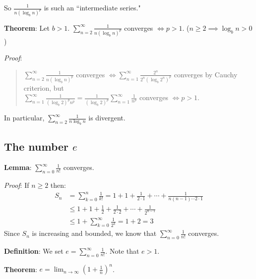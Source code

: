\documentclass[11pt]{article}
\begin{document}
So $\frac{1}{n(\log_b n)^p}$ is such an ``intermediate series."

\textbf{Theorem}: Let $b > 1$. $\sum\limits_{n=2}^\infty \frac{1}{n (\log_b n)^p}$ converges $\iff p > 1$. ($n \geq 2 \implies \log_b n > 0$)

\emph{Proof}:
\begin{quote}\vspace{-0.3cm}
$\sum\limits_{n=2}^\infty \frac{1}{n (\log_b n)^p}$ converges $\iff \sum\limits_{n=1}^\infty \frac{2^n}{2^n (\log_b 2^n)^p}$ converges by Cauchy criterion, but\\
$\sum\limits_{n=1}^\infty \frac{1}{(\log_b 2)^p n^p} = \frac{1}{(\log_b 2)^p} \sum\limits_{n=1}^\infty \frac{1}{n^p}$ converges $\iff p > 1$.
\end{quote}
In particular, $\sum\limits_{n=2}^\infty \frac{1}{n \log_b n}$ is divergent.

\subsection{The number $e$}

\textbf{Lemma}: $\sum_{n=0}^\infty \frac{1}{n!}$ converges.

\emph{Proof}: If $n \geq 2$ then:
\begin{align*}
S_n &= \sum_{k=0}^n \frac{1}{k!} = 1 + 1 + \frac{1}{2 \cdot 1} + \cdots + \frac{1}{n(n-1) \cdots 2 \cdot 1}\\
&\leq 1 + 1 + \frac{1}{2} + \frac{1}{2 \cdot 2} + \cdots + \frac{1}{2^{n-1}}\\
&\leq 1 + \sum_{k=0}^\infty \frac{1}{2^k} = 1 + 2 = 3
\end{align*}
Since $S_n$ is increasing and bounded, we know that $\sum_{n=0}^\infty \frac{1}{n!}$ converges.

\textbf{Definition}: We set $e = \sum\limits_{n=0}^\infty \frac{1}{n!}$. Note that $e > 1$.

\textbf{Theorem}: $e = \lim_{n \to \infty} (1+\frac{1}{n})^n$.
\end{document}
